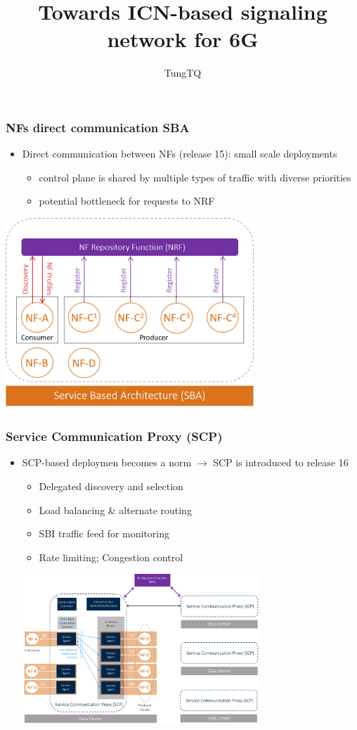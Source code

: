 \documentclass{beamer}
\title{Towards ICN-based signaling network for 6G}
\author{TungTQ}
\begin{document}
\begin{frame}
  \frametitle{NFs direct communication SBA}
  \begin{itemize}
    \item {Direct communication between NFs (release 15): small scale deployments
    \begin{itemize}
      \item control plane is shared by multiple types of traffic with diverse priorities
      \item potential bottleneck for requests to NRF
    \end{itemize}
    }

  \end{itemize}
  \center
  \includegraphics[width=0.7\textwidth]{images/sba-nrf}
\end{frame}
\begin{frame}
  \frametitle{Service Communication Proxy (SCP)}
  \begin{itemize}
    \item {SCP-based deploymen becomes a norm $\rightarrow $ SCP is introduced to release 16
    \begin{itemize}
    
    
    \item Delegated discovery and selection
    \item Load balancing \& alternate routing
    \item SBI traffic feed for monitoring
    \item Rate limiting; Congestion control
    \end{itemize}
    }
    \center
  \includegraphics[width=0.7\textwidth]{images/sba-scp}
  \end{itemize}
  
\end{frame}
\end{document}
